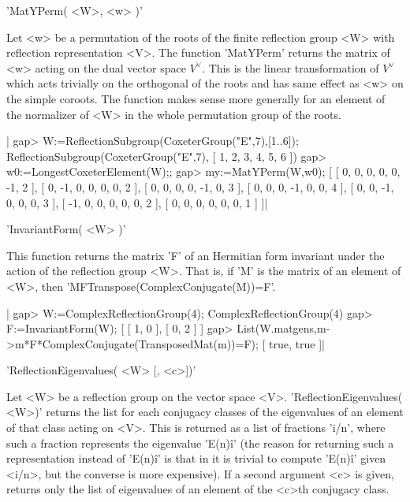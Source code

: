 
'MatYPerm( <W>, <w> )'

Let  <w> be a permutation  of the roots of  the finite reflection group <W>
with  reflection representation  <V>. The  function 'MatYPerm'  returns the
matrix  of <w> acting on the dual vector space $V^\vee$. This is the linear
transformation  of $V^\vee$ which  acts trivially on  the orthogonal of the
roots  and has same effect as <w> on the simple coroots. The function makes
sense  more generally for an element of  the normalizer of <W> in the whole
permutation group of the roots.

|    gap>  W:=ReflectionSubgroup(CoxeterGroup("E",7),[1..6]);
    ReflectionSubgroup(CoxeterGroup("E",7), [ 1, 2, 3, 4, 5, 6 ])
    gap>  w0:=LongestCoxeterElement(W);;
    gap> my:=MatYPerm(W,w0);
    [ [ 0, 0, 0, 0, 0, -1, 2 ], [ 0, -1, 0, 0, 0, 0, 2 ],
      [ 0, 0, 0, 0, -1, 0, 3 ], [ 0, 0, 0, -1, 0, 0, 4 ],
      [ 0, 0, -1, 0, 0, 0, 3 ], [ -1, 0, 0, 0, 0, 0, 2 ],
      [ 0, 0, 0, 0, 0, 0, 1 ] ]|


'InvariantForm( <W> )'

This  function returns the matrix 'F'  of an Hermitian form invariant under
the action of the reflection group <W>. That is, if 'M' is the matrix of an
element of <W>, then 'M\*F\*Transpose(ComplexConjugate(M))=F'.

|    gap> W:=ComplexReflectionGroup(4);
    ComplexReflectionGroup(4)
    gap> F:=InvariantForm(W);
    [ [ 1, 0 ], [ 0, 2 ] ]
    gap> List(W.matgens,m->m*F*ComplexConjugate(TransposedMat(m))=F);
    [ true, true ]|


'ReflectionEigenvalues( <W> [, <c>])'

Let <W> be a reflection group on the vector space <V>.
'ReflectionEigenvalues(  <W>)' returns the list  for each conjugacy classes
of  the eigenvalues  of an  element of  that class  acting on  <V>. This is
returned as a list of fractions 'i/n', where such a fraction represents the
eigenvalue  'E(n)\^i'  (the  reason  for  returning  such  a representation
instead  of 'E(n)\^i' is that in {\GAP}  it is trivial to compute 'E(n)\^i'
given  <i/n>, but the converse is more expensive). If a second argument <c>
is  given, returns only the list of  eigenvalues of an element of the <c>th
conjugacy class.

